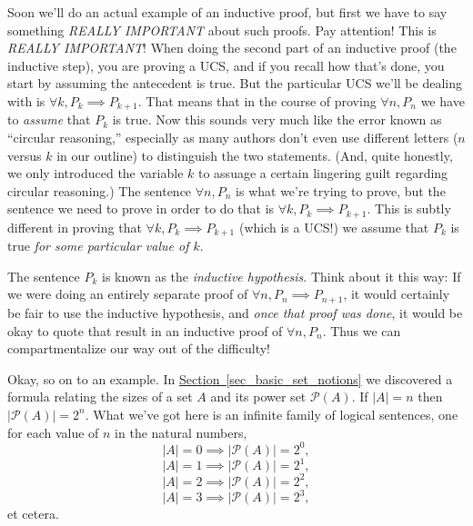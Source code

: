 \documentclass[10pt,]{book}
\theoremstyle{plain}
\theoremstyle{definition}
\theoremstyle{definition}
\numberwithin{equation}{section}
\begin{document}
    Soon we'll do an actual example of an inductive
    proof, but first we have to say something \emph{REALLY IMPORTANT}
    about such proofs. Pay attention! This is \emph{REALLY IMPORTANT}!
    When doing the second part of an inductive proof (the inductive step),
    you are proving a UCS, and if you recall how that's done, you start
    by assuming the antecedent is true. But the particular UCS we'll
    be dealing with is \(\forall k,  P_k \implies P_{k+1}\). That means
    that in the course of proving \(\forall n,  P_n\) we have to \emph{assume}
    that \(P_k\) is true. Now this sounds very much like the error known
    as ``circular reasoning,'' especially as many authors don't even
    use different letters (\(n\) versus \(k\) in our outline) to distinguish
    the two statements. (And, quite honestly, we only introduced the variable
    \(k\) to assuage a certain lingering guilt regarding circular reasoning.)
    The sentence \(\forall n,  P_n\) is what we're trying to prove, but the
    sentence we need to prove in order to do that is \(\forall k,  P_k \implies P_{k+1}\).
    This is subtly different \textemdash{} in proving that \(\forall k,  P_k \implies P_{k+1}\)
    (which is a UCS!) we assume that \(P_k\) is true \emph{for some particular value of \(k\)}.
\par

    The sentence \(P_k\) is known as the
    \emph{inductive hypothesis}.
    Think about it this way: If we were doing an entirely separate
    proof of \(\forall n,  P_n \implies P_{n+1}\), it would certainly be fair
    to use the inductive hypothesis, and \emph{once that proof was done},
    it would be okay to quote that result in an inductive proof of
    \(\forall n,  P_n\). Thus we can compartmentalize our way out of the
    difficulty!
\par

    Okay, so on to an example. In \hyperref[sec_basic_set_notions]{Section~\ref{sec_basic_set_notions}}
    we discovered a formula relating the sizes of a set \(A\) and its
    power set \({\mathcal P}(A)\). If \(|A| = n\) then \(|{\mathcal P}(A)| = 2^n\).
    What we've got here is an infinite family of logical sentences, one for
    each value of \(n\) in the natural numbers,
    \begin{equation*}
      |A| = 0 \implies |{\mathcal P}(A)| = 2^0,
    \end{equation*}
    \begin{equation*}
      |A| = 1 \implies |{\mathcal P}(A)| = 2^1,
    \end{equation*}
    \begin{equation*}
      |A| = 2 \implies |{\mathcal P}(A)| = 2^2,
    \end{equation*}
    \begin{equation*}
      |A| = 3 \implies |{\mathcal P}(A)| = 2^3,
    \end{equation*}
    et cetera.
\par
\end{document}
